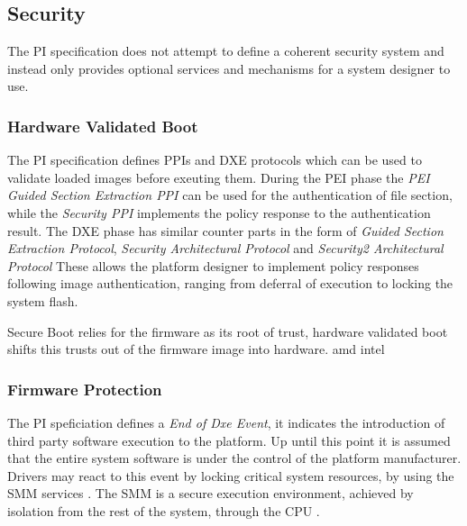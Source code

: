 
\subsection{Security}

The \ac{PI} specification does not attempt to define a coherent security system and instead only provides optional services and mechanisms for a system designer to use.

\subsubsection{Hardware Validated Boot}

The \ac{PI} specification defines \acp{PPI} and \ac{DXE} protocols which can be used to validate loaded images before exeuting them.
During the \ac{PEI} phase the \emph{\ac{PEI} Guided Section Extraction \ac{PPI}} can be used for the authentication of file section, while the \emph{Security \ac{PPI}} implements the policy response to the authentication result.
The \ac{DXE} phase has similar counter parts in the form of \emph{Guided Section Extraction Protocol}, \emph{Security Architectural Protocol} and \emph{Security2 Architectural Protocol}
These allows the platform designer to implement policy responses following image authentication, ranging from deferral of execution to locking the system flash.


Secure Boot relies for the firmware as its root of trust, hardware validated boot shifts this trusts out of the firmware image into hardware.
amd
intel

\subsubsection{Firmware Protection}

The \ac{PI} speficiation defines a \emph{End of Dxe Event}, it indicates the introduction of third party software execution to the platform.
Up until this point it is assumed that the entire system software is under the control of the platform manufacturer.
Drivers may react to this event by locking critical system resources, by using the \ac{SMM} services \cite[Vol. 2, 5.1.2.1]{pi-spec}.
The \ac{SMM} is a secure execution environment, achieved by isolation from the rest of the system, through the \ac{CPU} \cite[Vol. 4, Section 1.3]{pi-spec}.





